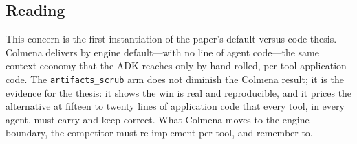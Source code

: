 \subsection{Reading}
\label{subsec:context-reading}

This concern is the first instantiation of the paper's default-versus-code
thesis. Colmena delivers by engine default---with no line of agent
code---the same context economy that the ADK reaches only by hand-rolled,
per-tool application code. The \texttt{artifacts\_scrub} arm does not diminish the
Colmena result; it is the evidence for the thesis: it shows the win is real
and reproducible, and it prices the alternative at fifteen to twenty lines
of application code that every tool, in every agent, must carry and keep
correct. What Colmena moves to the engine boundary, the competitor must
re-implement per tool, and remember to.
